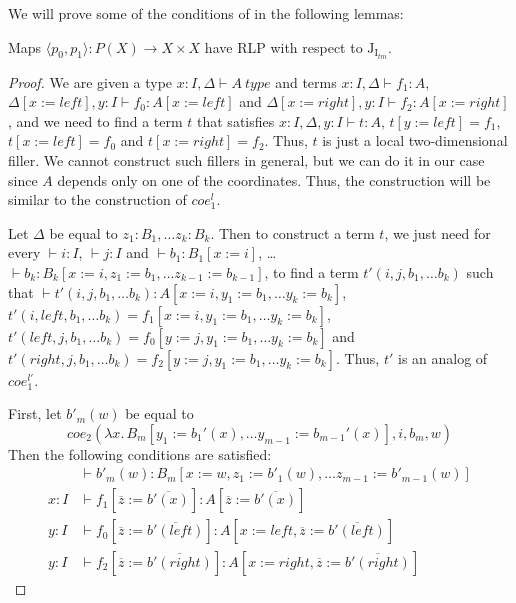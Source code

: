 \documentclass{mscs}
\newcommand{\repl}{:=}
\newcommand{\I}{\mathrm{I}}
\newcommand{\J}{\mathrm{J}}
\numberwithin{figure}{section}
\begin{document}
We will prove some of the conditions of  in the following lemmas:
\begin{lem}[Jtm]
Maps $\langle p_0, p_1 \rangle : P(X) \to X \times X$ have RLP with respect to $\J_{\I_{tm}}$.
\end{lem}
\begin{proof}
We are given a type $x : I, \Delta \vdash A\ type$ and terms $x : I, \Delta \vdash f_1 : A$, $\Delta[x \repl left], y : I \vdash f_0 : A[x \repl left]$ and $\Delta[x \repl right], y : I \vdash f_2 : A[x \repl right]$,
and we need to find a term $t$ that satisfies $x : I, \Delta, y : I \vdash t : A$, $t[y \repl left] = f_1$, $t[x \repl left] = f_0$ and $t[x \repl right] = f_2$.
Thus, $t$ is just a local two-dimensional filler.
We cannot construct such fillers in general, but we can do it in our case since $A$ depends only on one of the coordinates.
Thus, the construction will be similar to the construction of $coe^l_1$.

Let $\Delta$ be equal to $z_1 : B_1, \ldots z_k : B_k$.
Then to construct a term $t$, we just need for every $\vdash i : I$, $\vdash j : I$ and $\vdash b_1 : B_1[x \repl i]$, \ldots $\vdash b_k : B_k[x \repl i, z_1 \repl b_1, \ldots z_{k-1} \repl b_{k-1}]$,
to find a term $t'(i, j, b_1, \ldots b_k)$ such that $\vdash t'(i, j, b_1, \ldots b_k) : A[x \repl i, y_1 \repl b_1, \ldots y_k \repl b_k]$, $t'(i, left, b_1, \ldots b_k) = f_1[x \repl i, y_1 \repl b_1, \ldots y_k \repl b_k]$,
$t'(left, j, b_1, \ldots b_k) = f_0[y \repl j, y_1 \repl b_1, \ldots y_k \repl b_k]$ and $t'(right, j, b_1, \ldots b_k) = f_2[y \repl j, y_1 \repl b_1, \ldots y_k \repl b_k]$.
Thus, $t'$ is an analog of $coe^{l'}_1$.

First, let $b'_m(w)$ be equal to
\[ coe_2(\lambda x.\,B_m[y_1 \repl b_1'(x), \ldots y_{m-1} \repl b_{m-1}'(x)], i, b_m, w) \]
Then the following conditions are satisfied:
\begin{align*}
& \vdash b'_m(w) : B_m[x \repl w, z_1 \repl b'_1(w), \ldots z_{m-1} \repl b'_{m-1}(w)] \\
x : I & \vdash f_1[\overline{z} \repl \overline{b'(x)}] : A[\overline{z} \repl \overline{b'(x)}] \\
y : I & \vdash f_0[\overline{z} \repl \overline{b'(left)}] : A[x \repl left, \overline{z} \repl \overline{b'(left)}] \\
y : I & \vdash f_2[\overline{z} \repl \overline{b'(right)}] : A[x \repl right, \overline{z} \repl \overline{b'(right)}]
\end{align*}
\end{proof}
\end{document}
